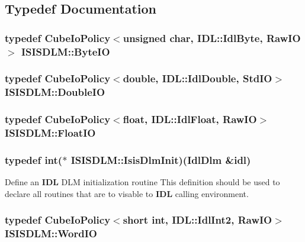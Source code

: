 \subsection{Typedef Documentation}
\subsubsection{\setlength{\rightskip}{0pt plus 5cm}typedef {\bf Cube\-Io\-Policy}$<$unsigned char, IDL::Idl\-Byte, {\bf Raw\-IO}$>$ {\bf ISISDLM::Byte\-IO}}\label{namespaceISISDLM_a1}


\subsubsection{\setlength{\rightskip}{0pt plus 5cm}typedef {\bf Cube\-Io\-Policy}$<$double, IDL::Idl\-Double, {\bf Std\-IO}$>$ {\bf ISISDLM::Double\-IO}}\label{namespaceISISDLM_a0}


\subsubsection{\setlength{\rightskip}{0pt plus 5cm}typedef {\bf Cube\-Io\-Policy}$<$float, IDL::Idl\-Float, {\bf Raw\-IO}$>$ {\bf ISISDLM::Float\-IO}}\label{namespaceISISDLM_a3}


\subsubsection{\setlength{\rightskip}{0pt plus 5cm}typedef int($\ast$  {\bf ISISDLM::Isis\-Dlm\-Init})(Idl\-Dlm \&idl)}\label{namespaceISISDLM_a4}


Define an {\bf IDL} DLM initialization routine This definition should be used to declare all routines that are to visable to {\bf IDL} calling environment. 
\subsubsection{\setlength{\rightskip}{0pt plus 5cm}typedef {\bf Cube\-Io\-Policy}$<$short int, IDL::Idl\-Int2, {\bf Raw\-IO}$>$ {\bf ISISDLM::Word\-IO}}\label{namespaceISISDLM_a2}




